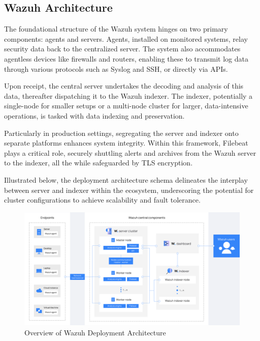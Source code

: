 \subsection{Wazuh Architecture}

The foundational structure of the Wazuh system hinges on two primary components: agents and servers. Agents, installed on monitored systems, relay security data back to the centralized server. The system also accommodates agentless devices like firewalls and routers, enabling these to transmit log data through various protocols such as Syslog and SSH, or directly via APIs.

Upon receipt, the central server undertakes the decoding and analysis of this data, thereafter dispatching it to the Wazuh indexer. The indexer, potentially a single-node for smaller setups or a multi-node cluster for larger, data-intensive operations, is tasked with data indexing and preservation.

Particularly in production settings, segregating the server and indexer onto separate platforms enhances system integrity. Within this framework, Filebeat plays a critical role, securely shuttling alerts and archives from the Wazuh server to the indexer, all the while safeguarded by TLS encryption.

Illustrated below, the deployment architecture schema delineates the interplay between server and indexer within the ecosystem, underscoring the potential for cluster configurations to achieve scalability and fault tolerance.

\begin{figure} [H]
\centering
\includegraphics[width=\textwidth]{images/architecture.png}
\caption{Overview of Wazuh Deployment Architecture}
\label{fig:wazuharchitecture}
\end{figure}
